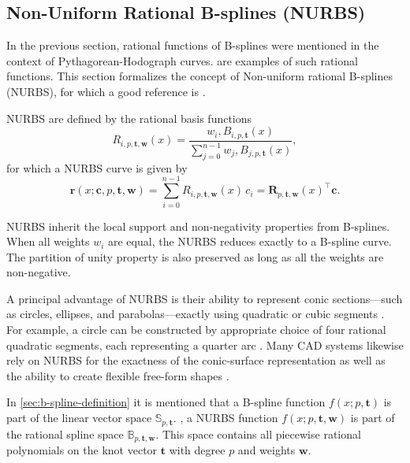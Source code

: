 \subsection{Non-Uniform Rational B-splines (NURBS)}
In the previous section, rational functions of B-splines were mentioned in the context of Pythagorean-Hodograph curves.  are examples of such rational functions. This section formalizes the concept of Non-uniform rational B-splines (NURBS), for which a good reference is \cite{Piegl1997}. 

NURBS are defined by the rational basis functions
\begin{equation}\label{eq:nurbs-basis}
R_{i,p,\mathbf t, \mathbf w}(x)  = \frac{w_i,B_{i,p,\mathbf t}(x)}{\sum_{j=0}^{n-1}w_j,B_{j,p,\mathbf t}(x)},
\end{equation}
for which a NURBS curve is given by
\begin{equation}\label{eq:nurbs-curve}
\mathbf r(x; \mathbf c, p, \mathbf t, \mathbf w)  = \sum_{i=0}^{n-1}R_{i,p,\mathbf t, \mathbf w}(x)\,c_i
= \mathbf R_{p,\mathbf t, \mathbf w}(x)^\top \mathbf c.
\end{equation}

NURBS inherit the local support and non-negativity properties from B-splines. When all weights $w_i$ are equal, the NURBS reduces exactly to a B-spline curve. The partition of unity property is also preserved as long as all the weights are non-negative. \citep{Piegl1997}

A principal advantage of NURBS is their ability to represent conic sections---such as circles, ellipses, and parabolas---exactly using quadratic or cubic segments \citep{Piegl1997}. For example, a circle can be constructed by appropriate choice of four rational quadratic segments, each representing a quarter arc \citep{DenbighStarkeyNURBS}. Many CAD systems likewise rely on NURBS for the exactness of the conic-surface representation as well as the ability to create flexible free-form shapes \citep{Farin1991,PieglTillerSIGGRAPH,cottrell2009isogeometric}.

In \cref{sec:b-spline-definition} it is mentioned that a B-spline function $f(x; p, \mathbf t)$ is part of the linear vector space $\mathbb S_{p, \mathbf t}$.
, a NURBS function $f(x; p, \mathbf t, \mathbf w)$ is part of the rational spline space $\mathbb B_{p, \mathbf t, \mathbf w}$. This space contains all piecewise rational polynomials on the knot vector $\mathbf t$ with degree $p$ and weights $\mathbf w$. 



